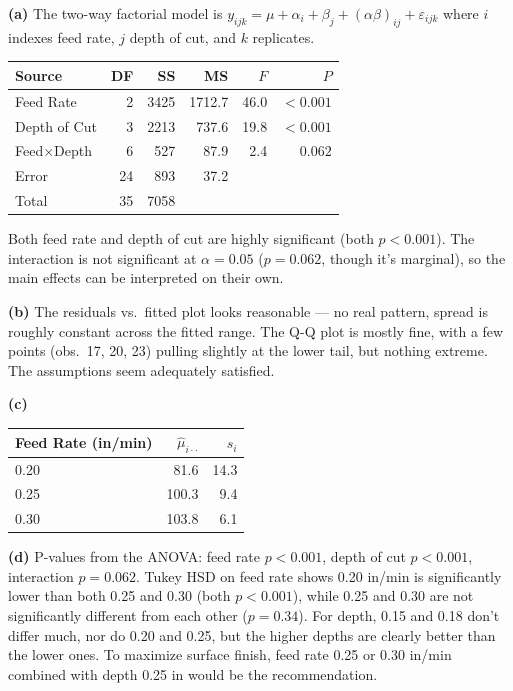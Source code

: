 \documentclass[answers,12pt,addpoints]{exam}
\begin{document}
\begin{solution}

\textbf{(a)} The two-way factorial model is $y_{ijk} = \mu + \alpha_i + \beta_j + (\alpha\beta)_{ij} + \varepsilon_{ijk}$ where $i$ indexes feed rate, $j$ depth of cut, and $k$ replicates.

\begin{center}
\begin{tabular}{lrrrrr}
\hline
Source              & DF &   SS   &   MS    & $F$    & $P$          \\
\hline
Feed Rate           &  2 & 3425   & 1712.7  & 46.0 & $<0.001$ \\
Depth of Cut        &  3 & 2213   &  737.6  & 19.8 & $<0.001$ \\
Feed$\times$Depth   &  6 &  527   &   87.9  &  2.4 & $0.062$            \\
Error               & 24 &  893   &   37.2  &      &                     \\
\hline
Total               & 35 & 7058   &         &        &                     \\
\hline
\end{tabular}
\end{center}

Both feed rate and depth of cut are highly significant (both $p < 0.001$). The interaction is not significant at $\alpha = 0.05$ ($p = 0.062$, though it's marginal), so the main effects can be interpreted on their own.

\textbf{(b)} The residuals vs.\ fitted plot looks reasonable — no real pattern, spread is roughly constant across the fitted range. The Q-Q plot is mostly fine, with a few points (obs.\ 17, 20, 23) pulling slightly at the lower tail, but nothing extreme. The assumptions seem adequately satisfied.

\textbf{(c)}
\begin{center}
\begin{tabular}{lrr}
\hline
Feed Rate (in/min) & $\hat{\mu}_{i\cdot\cdot}$ & $s_i$ \\
\hline
0.20 & 81.6  & 14.3 \\
0.25 & 100.3 & 9.4  \\
0.30 & 103.8 & 6.1  \\
\hline
\end{tabular}
\end{center}

\textbf{(d)} P-values from the ANOVA: feed rate $p < 0.001$, depth of cut $p < 0.001$, interaction $p = 0.062$. Tukey HSD on feed rate shows 0.20 in/min is significantly lower than both 0.25 and 0.30 (both $p < 0.001$), while 0.25 and 0.30 are not significantly different from each other ($p = 0.34$). For depth, 0.15 and 0.18 don't differ much, nor do 0.20 and 0.25, but the higher depths are clearly better than the lower ones. To maximize surface finish, feed rate 0.25 or 0.30 in/min combined with depth 0.25 in would be the recommendation.

\end{solution}
\end{document}

